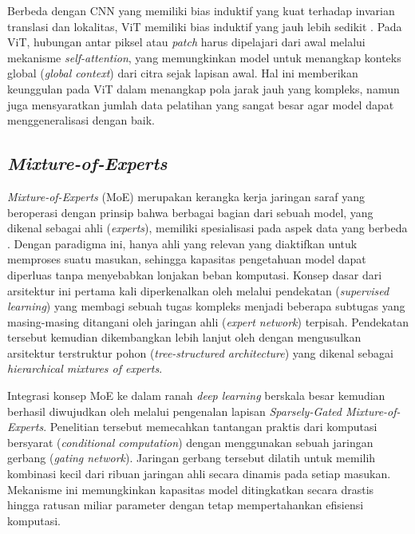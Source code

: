 Berbeda dengan CNN yang memiliki bias induktif yang kuat terhadap invarian translasi dan lokalitas, ViT memiliki bias induktif yang jauh lebih sedikit \parencite{dosovitskiyImageWorth16x162020a}. Pada ViT, hubungan antar piksel atau \textit{patch} harus dipelajari dari awal melalui mekanisme \textit{self-attention}, yang memungkinkan model untuk menangkap konteks global (\textit{global context}) dari citra sejak lapisan awal. Hal ini memberikan keunggulan pada ViT dalam menangkap pola jarak jauh yang kompleks, namun juga mensyaratkan jumlah data pelatihan yang sangat besar agar model dapat menggeneralisasi dengan baik.

\subsection{\textit{Mixture-of-Experts}}
\textit{Mixture-of-Experts} (MoE) merupakan kerangka kerja jaringan saraf yang beroperasi dengan prinsip bahwa berbagai bagian dari sebuah model, yang dikenal sebagai ahli (\textit{experts}), memiliki spesialisasi pada aspek data yang berbeda \parencite{caiSurveyMixtureExperts2025}. Dengan paradigma ini, hanya ahli yang relevan yang diaktifkan untuk memproses suatu masukan, sehingga kapasitas pengetahuan model dapat diperluas tanpa menyebabkan lonjakan beban komputasi. Konsep dasar dari arsitektur ini pertama kali diperkenalkan oleh \textcite{jacobsAdaptiveMixturesLocal1991} melalui pendekatan (\textit{supervised learning}) yang membagi sebuah tugas kompleks menjadi beberapa subtugas yang masing-masing ditangani oleh jaringan ahli (\textit{expert network}) terpisah. Pendekatan tersebut kemudian dikembangkan lebih lanjut oleh \textcite{jordanHierarchicalMixturesExperts1993} dengan mengusulkan arsitektur terstruktur pohon (\textit{tree-structured architecture}) yang dikenal sebagai \textit{hierarchical mixtures of experts}. 

Integrasi konsep MoE ke dalam ranah \textit{deep learning} berskala besar kemudian berhasil diwujudkan oleh \textcite{shazeerOutrageouslyLargeNeural2017} melalui pengenalan lapisan \textit{Sparsely-Gated Mixture-of-Experts}. Penelitian tersebut memecahkan tantangan praktis dari komputasi bersyarat (\textit{conditional computation}) dengan menggunakan sebuah jaringan gerbang (\textit{gating network}). Jaringan gerbang tersebut dilatih untuk memilih kombinasi kecil dari ribuan jaringan ahli secara dinamis pada setiap masukan. Mekanisme ini memungkinkan kapasitas model ditingkatkan secara drastis hingga ratusan miliar parameter dengan tetap mempertahankan efisiensi komputasi.

